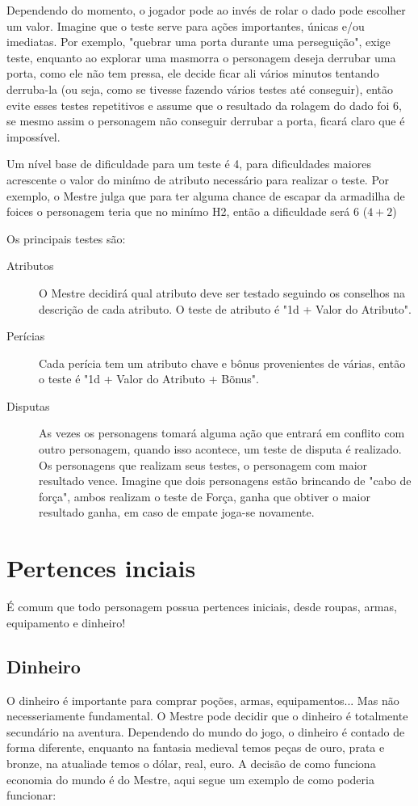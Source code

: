 Dependendo do momento, o jogador pode ao invés de rolar o dado pode escolher um valor. Imagine que o teste serve para ações importantes, únicas e/ou imediatas. Por exemplo, "quebrar uma porta durante uma perseguição", exige teste, enquanto ao explorar uma masmorra o personagem deseja derrubar uma porta, como ele não tem pressa, ele decide ficar ali vários minutos tentando derruba-la (ou seja, como se tivesse fazendo vários testes até conseguir), então evite esses testes repetitivos e assume que o resultado da rolagem do dado foi 6, se mesmo assim o personagem não conseguir derrubar a porta, ficará claro que é impossível.

Um nível base de dificuldade para um teste é 4, para dificuldades maiores acrescente o valor do minímo de atributo necessário para realizar o teste. Por exemplo, o Mestre julga que para ter alguma chance de escapar da armadilha de foices o personagem teria que no minímo H2, então a dificuldade será 6 (\(4 + 2 \))

Os principais testes são:

\begin{description}
\item[Atributos] O Mestre decidirá qual atributo deve ser testado seguindo os conselhos na descrição de cada atributo. O teste de atributo é "1d + Valor do Atributo".
\item[Perícias] Cada perícia tem um atributo chave e bônus provenientes de várias, então o teste é "1d + Valor do Atributo + Bõnus".
\item[Disputas] As vezes os personagens tomará alguma ação que entrará em conflito com outro personagem, quando isso acontece, um teste de disputa é realizado. Os personagens que realizam seus testes, o personagem com maior resultado vence. Imagine que dois personagens estão brincando de "cabo de força", ambos realizam o teste de Força, ganha que obtiver o maior resultado ganha, em caso de empate joga-se novamente.
\end{description}

\section{Pertences inciais}
É comum que todo personagem possua pertences iniciais, desde roupas, armas, equipamento e dinheiro!
\subsection{Dinheiro}
O dinheiro é importante para comprar poções, armas, equipamentos... Mas não necesseriamente fundamental. O Mestre pode decidir que o dinheiro é totalmente secundário na aventura. Dependendo do mundo do jogo, o dinheiro é contado de forma diferente, enquanto na fantasia medieval temos peças de ouro, prata e bronze, na atualiade temos o dólar, real, euro. A decisão de como funciona economia do mundo é do Mestre, aqui segue um exemplo de como poderia funcionar:


